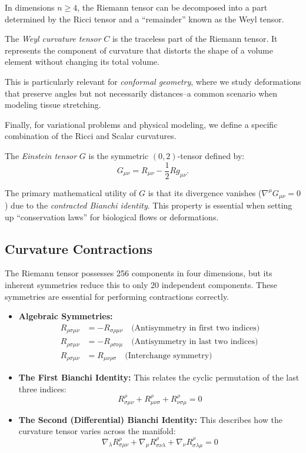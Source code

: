 In dimensions $n \geq 4$, the Riemann tensor can be decomposed into a part determined by the Ricci tensor and a ``remainder'' known as the Weyl tensor.
\begin{definition}
  The \emph{Weyl curvature tensor} $C$ is the traceless part of the Riemann tensor. It represents the component of curvature that distorts the shape of a volume element without changing its total volume.
\end{definition}
This is particularly relevant for \emph{conformal geometry}, where we study deformations that preserve angles but not necessarily distances--a common scenario when modeling tissue stretching.

Finally, for variational problems and physical modeling, we define a specific combination of the Ricci and Scalar curvatures.
\begin{definition}
  The \emph{Einstein tensor} $G$ is the symmetric $(0,2)$-tensor defined by:
  \[%
    G_{\mu\nu} = R_{\mu\nu} - \frac{1}{2} R g_{\mu\nu}
  .\]%
\end{definition}
The primary mathematical utility of $G$ is that its divergence vanishes ($\nabla^\mu G_{\mu\nu} = 0$) due to the \emph{contracted Bianchi identity}. This property is essential when setting up ``conservation laws'' for biological flows or deformations.

\subsection{Curvature Contractions}

The Riemann tensor possesses 256 components in four dimensions, but its inherent symmetries reduce this to only 20 independent components. These symmetries are essential for performing contractions correctly.

\begin{itemize}
  \item \textbf{Algebraic Symmetries:}
    \begin{align}
      R_{\rho\sigma\mu\nu} &= -R_{\sigma\rho\mu\nu} \quad \text{(Antisymmetry in first two indices)} \\
      R_{\rho\sigma\mu\nu} &= -R_{\rho\sigma\nu\mu} \quad \text{(Antisymmetry in last two indices)} \\
      R_{\rho\sigma\mu\nu} &= R_{\mu\nu\rho\sigma} \quad \text{(Interchange symmetry)}
    \end{align}

  \item \textbf{The First Bianchi Identity:} This relates the cyclic permutation of the last three indices:
    \[ R^\rho_{\sigma\mu\nu} + R^\rho_{\mu\nu\sigma} + R^\rho_{\nu\sigma\mu} = 0 \]

  \item \textbf{The Second (Differential) Bianchi Identity:} This describes how the curvature tensor varies across the manifold:
    \[ \nabla_\lambda R^\rho_{\sigma\mu\nu} + \nabla_\mu R^\rho_{\sigma\nu\lambda} + \nabla_\nu R^\rho_{\sigma\lambda\mu} = 0 \]
\end{itemize}

